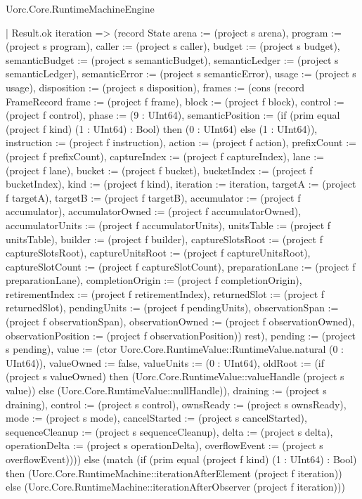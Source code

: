 \begin{lexlean}{Uorc.Core.RuntimeMachineEngine}
\begin{semanticmodule}
{      | Result.ok iteration => (record State {arena := (project s arena), program := (project s program), caller := (project s caller), budget := (project s budget), semanticBudget := (project s semanticBudget), semanticLedger := (project s semanticLedger), semanticError := (project s semanticError), usage := (project s usage), disposition := (project s disposition), frames := (cons (record FrameRecord {frame := (project f frame), block := (project f block), control := (project f control), phase := (9 : UInt64), semanticPosition := (if (prim equal (project f kind) (1 : UInt64) : Bool) then (0 : UInt64) else (1 : UInt64)), instruction := (project f instruction), action := (project f action), prefixCount := (project f prefixCount), captureIndex := (project f captureIndex), lane := (project f lane), bucket := (project f bucket), bucketIndex := (project f bucketIndex), kind := (project f kind), iteration := iteration, targetA := (project f targetA), targetB := (project f targetB), accumulator := (project f accumulator), accumulatorOwned := (project f accumulatorOwned), accumulatorUnits := (project f accumulatorUnits), unitsTable := (project f unitsTable), builder := (project f builder), captureSlotsRoot := (project f captureSlotsRoot), captureUnitsRoot := (project f captureUnitsRoot), captureSlotCount := (project f captureSlotCount), preparationLane := (project f preparationLane), completionOrigin := (project f completionOrigin), retirementIndex := (project f retirementIndex), returnedSlot := (project f returnedSlot), pendingUnits := (project f pendingUnits), observationSpan := (project f observationSpan), observationOwned := (project f observationOwned), observationPosition := (project f observationPosition)}) rest), pending := (project s pending), value := (ctor Uorc.Core.RuntimeValue::RuntimeValue.natural (0 : UInt64)), valueOwned := false, valueUnits := (0 : UInt64), oldRoot := (if (project s valueOwned) then (Uorc.Core.RuntimeValue::valueHandle (project s value)) else (Uorc.Core.RuntimeValue::nullHandle)), draining := (project s draining), control := (project s control), ownsReady := (project s ownsReady), mode := (project s mode), cancelStarted := (project s cancelStarted), sequenceCleanup := (project s sequenceCleanup), delta := (project s delta), operationDelta := (project s operationDelta), overflowEvent := (project s overflowEvent)}))) else (match (if (prim equal (project f kind) (1 : UInt64) : Bool) then (Uorc.Core.RuntimeMachine::iterationAfterElement (project f iteration)) else (Uorc.Core.RuntimeMachine::iterationAfterObserver (project f iteration)))
}
\end{semanticmodule}
\end{lexlean}
